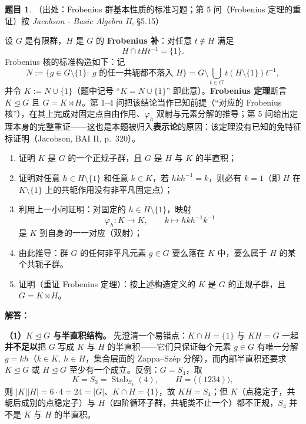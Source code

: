 \documentclass[a4paper]{ctexart}
\theoremstyle{definition}
\newtheorem{example}{题目}[section]
\theoremstyle{analysis}
\theoremstyle{plain}
\begin{document}
\begin{example}
（出处：Frobenius 群基本性质的标准习题；第 5 问（Frobenius 定理的重证）按 \textit{Jacobson - Basic Algebra II}, §5.15）

设 \(G\) 是有限群，\(H\) 是 \(G\) 的 \textbf{Frobenius 补}：对任意 \(t\notin H\) 满足
\[
  H\cap tHt^{-1}=\{1\}.
\]
Frobenius 核的标准构造如下：记
\[
  N:=\bigl\{g\in G\setminus\{1\}:\ \text{\(g\) 的任一共轭都不落入 }H\bigr\}
  =G\setminus\bigcup_{t\in G}t(H\setminus\{1\})t^{-1},
\]
并令 \(K:=N\cup\{1\}\)（题中记号 “\(K=N\cup\{1\}\)” 即此意）。\textbf{Frobenius 定理}断言 \(K\trianglelefteq G\) 且 \(G=K\rtimes H\)。第 1--4 问把该结论当作已知前提（“对应的 Frobenius 核”），在其上完成对固定点自由作用、\(\varphi_h\) 双射与元素分解的推导；第 5 问给出定理本身的完整重证——这也是本题被归入\textbf{表示论}的原因：该定理没有已知的免特征标证明（Jacobson, BAI II, p.~320）。

\begin{enumerate}
  \item 证明 \(K\) 是 \(G\) 的一个正规子群，且 \(G\) 是 \(H\) 与 \(K\) 的半直积；
  \item 证明对任意 \(h\in H\setminus\{1\}\) 和任意 \(k\in K\)，若 \(hkh^{-1}=k\)，则必有 \(k=1\)（即 \(H\) 在 \(K\setminus\{1\}\) 上的共轭作用没有非平凡固定点）；
  \item 利用上一小问证明：对固定的 \(h\in H\setminus\{1\}\)，映射
  \[
    \varphi_h\colon K\to K,\qquad k\longmapsto hkh^{-1}k^{-1}
  \]
  是 \(K\) 到自身的一一对应（双射）；
  \item 由此推导：群 \(G\) 的任何非平凡元素 \(g\in G\) 要么落在 \(K\) 中，要么属于 \(H\) 的某个共轭子群。
  \item 证明（重证 Frobenius 定理）：按上述构造定义的 \(K\) 是 \(G\) 的正规子群，且 \(G=K\rtimes H\)。
\end{enumerate}

\textbf{解答：}

\textbf{（1）\(K\trianglelefteq G\) 与半直积结构。} 先澄清一个易错点：\(K\cap H=\{1\}\) 与 \(KH=G\) 一起\textbf{并不足以}把 \(G\) 写成 \(K\) 与 \(H\) 的半直积——它们只保证每个元素 \(g\in G\) 有唯一分解 \(g=kh\)（\(k\in K,\ h\in H\)，集合层面的 Zappa--Szép 分解），而内部半直积还要求 \(K\trianglelefteq G\) 或 \(H\trianglelefteq G\) 至少有一个成立。反例：\(G=S_4\)，取
\[
  K=S_3=\operatorname{Stab}_{S_4}(4),\qquad H=\langle(1234)\rangle,
\]
则 \(|K||H|=6\cdot 4=24=|G|\)、\(K\cap H=\{1\}\)，故 \(KH=S_4\)；但 \(K\)（点稳定子，共轭后成别的点稳定子）与 \(H\)（四阶循环子群，共轭类不止一个）都不正规，\(S_4\) 并不是 \(K\) 与 \(H\) 的半直积。


\end{example}
\end{document}
